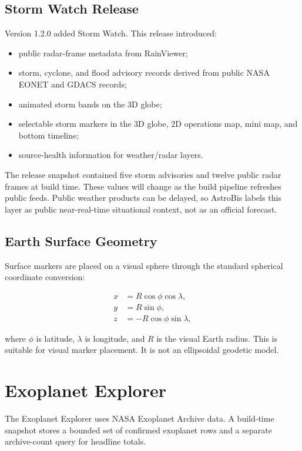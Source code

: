 \documentclass[11pt,a4paper]{article}
\begin{document}
\subsection{Storm Watch Release}

Version 1.2.0 added Storm Watch. This release introduced:

\begin{itemize}[leftmargin=*]
  \item public radar-frame metadata from RainViewer;
  \item storm, cyclone, and flood advisory records derived from public NASA EONET and GDACS records;
  \item animated storm bands on the 3D globe;
  \item selectable storm markers in the 3D globe, 2D operations map, mini map, and bottom timeline;
  \item source-health information for weather/radar layers.
\end{itemize}

The release snapshot contained five storm advisories and twelve public radar frames at build time. These values will change as the build pipeline refreshes public feeds. Public weather products can be delayed, so AstroBis labels this layer as public near-real-time situational context, not as an official forecast.

\subsection{Earth Surface Geometry}

Surface markers are placed on a visual sphere through the standard spherical coordinate conversion:

\begin{align}
x &= R\cos\phi\cos\lambda,\\
y &= R\sin\phi,\\
z &= -R\cos\phi\sin\lambda,
\end{align}

where $\phi$ is latitude, $\lambda$ is longitude, and $R$ is the visual Earth radius. This is suitable for visual marker placement. It is not an ellipsoidal geodetic model.

\section{Exoplanet Explorer}

The Exoplanet Explorer uses NASA Exoplanet Archive data. A build-time snapshot stores a bounded set of confirmed exoplanet rows and a separate archive-count query for headline totals.
\end{document}

